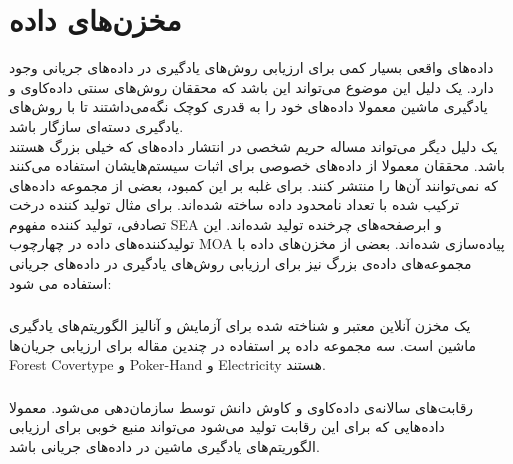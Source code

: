 \section{مخزن‌های داده}
داده‌های واقعی بسیار کمی برای ارزیابی روش‌های یادگیری در داده‌های جریانی وجود دارد\cite{Nguyen2015}. یک دلیل این ‌موضوع می‌تواند این باشد که محققان روش‌های سنتی داده‌کاوی و یادگیری ماشین معمولا داده‌های خود را به قدری کوچک نگه‌می‌داشتند تا با روش‌های یادگیری دسته‌ای
سازگار باشد.
\\

 یک دلیل دیگر می‌تواند مساله حریم شخصی در انتشار داده‌های که خیلی بزرگ هستند باشد. محققان معمولا از داده‌های خصوصی برای اثبات سیستم‌هایشان استفاده می‌کنند که نمی‌توانند آن‌ها را منتشر کنند. برای غلبه بر این کمبود، بعضی از مجموعه داده‌های ترکیب شده با تعداد نامحدود داده ساخته شده‌اند. برای مثال تولید کننده ‌درخت تصادفی، تولید‌ کننده مفهوم SEA و ابرصفحه‌های چرخنده تولید شده‌اند. این تولیدکننده‌های داده در چهارچوب MOA پیاده‌سازی شده‌اند\cite{bifet2010moa}. بعضی از مخزن‌های داده با مجموعه‌های داده‌ی بزرگ نیز برای ارزیابی روش‌های یادگیری در داده‌های جریانی استفاده می شود:
\subsubsection{}
یک مخزن آنلاین معتبر  و شناخته شده برای آزمایش و آنالیز الگوریتم‌های یادگیری ماشین است. سه مجموعه داده پر استفاده در چندین مقاله برای ارزیابی جریان‌ها Forest Covertype و Poker-Hand و Electricity هستند\cite{Nguyen2015}.
\subsubsection{}
رقابت‌های سالانه‌ی داده‌کاوی و کاوش دانش توسط
سازمان‌دهی می‌شود. معمولا داده‌هایی که برای این رقابت تولید می‌شود می‌تواند منبع خوبی برای ارزیابی الگوریتم‌های یادگیری ماشین در داده‌های جریانی باشد.
